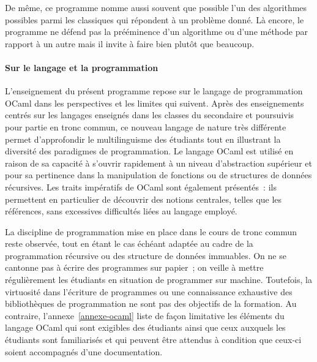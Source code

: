 De même, ce programme nomme aussi souvent que possible l'un des algorithmes possibles parmi les classiques qui répondent à un problème donné. Là encore, le programme ne défend pas la prééminence d'un algorithme ou d'une méthode par rapport à un autre mais il invite à faire bien plutôt que beaucoup. %

\paragraph{Sur le langage et la programmation}
L'enseignement du présent programme repose sur le langage de programmation OCaml dans les perspectives et les limites qui suivent.
Après des enseignements centrés sur les langages enseignés dans les classes du secondaire et poursuivis pour partie en tronc commun, ce nouveau langage de nature très différente permet d'approfondir le multilinguisme des étudiants tout en illustrant la diversité des paradigmes de programmation. 
Le langage OCaml est utilisé en raison de sa capacité à s'ouvrir rapidement à un niveau d'abstraction supérieur et pour sa pertinence dans la manipulation de fonctions ou de structures de données récursives. 
Les traits impératifs de OCaml sont également présentés~: ils permettent en particulier de découvrir des notions centrales, telles que les références, sans excessives difficultés liées au langage employé. 

La discipline de programmation mise en place dans le cours de tronc commun reste observée, tout en étant le cas échéant adaptée au cadre de la programmation récursive ou des structure de données immuables.
On ne se cantonne pas à écrire des programmes sur papier~; on veille à mettre régulièrement les étudiants en situation de programmer sur machine.
Toutefois, la virtuosité dans l'écriture de programmes ou une connaissance exhaustive des
bibliothèques de programmation ne sont pas des objectifs de la formation. Au contraire, l'annexe~\ref{annexe-ocaml} liste de façon limitative les éléments du langage OCaml qui sont exigibles des étudiants ainsi que ceux auxquels les étudiants sont familiarisés et qui peuvent être attendus à condition que ceux-ci soient accompagnés d'une documentation. 
